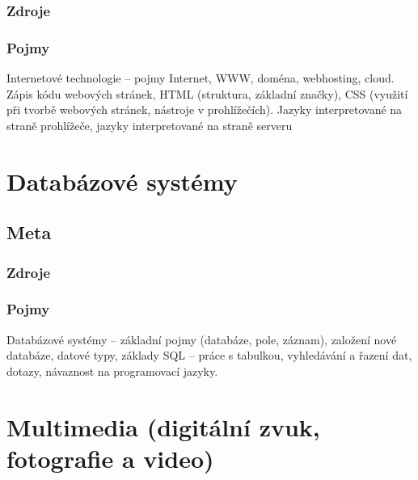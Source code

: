 \documentclass[12pt]{article}
\begin{document}
\subsubsection{Zdroje}
\subsubsection{Pojmy}
Internetové technologie – pojmy Internet, WWW, doména, webhosting, cloud. Zápis kódu webových stránek, HTML (struktura, základní značky), CSS (využití při tvorbě webových stránek, nástroje v prohlížečích). Jazyky interpretované na straně prohlížeče, jazyky interpretované na straně serveru

\section{Databázové systémy}
\subsection{Meta}
\subsubsection{Zdroje}
\subsubsection{Pojmy}
Databázové systémy – základní pojmy (databáze, pole, záznam), založení nové databáze, datové typy, základy SQL – práce s tabulkou, vyhledávání a řazení dat, dotazy, návaznost na programovací jazyky.

\section{Multimedia (digitální zvuk, fotografie a video)}
\end{document}

